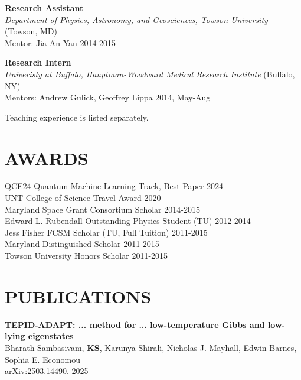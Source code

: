 \documentclass[marginmode, 10pt]{res} %
\newcommand{\me}{\textbf{KS}}       %
\begin{document}
\begin{resume}
\textbf{Research Assistant} \\
\textit{Department of Physics, Astronomy, and Geosciences, Towson University} (Towson, MD) \\
Mentor: Jia-An Yan \hfill 2014-2015

\textbf{Research Intern} \\
\textit{Univeristy at Buffalo, Hauptman-Woodward Medical Research Institute} (Buffalo, NY) \\
Mentors: Andrew Gulick, Geoffrey Lippa \hfill 2014, May-Aug

Teaching experience is listed separately.


\section{\small{AWARDS}}

QCE24 Quantum Machine Learning Track, Best Paper \hfill 2024 \\
UNT College of Science Travel Award \hfill 2020 \\
Maryland Space Grant Consortium Scholar \hfill 2014-2015 \\
Edward L. Rubendall Outstanding Physics Student (TU) \hfill 2012-2014 \\
Jess Fisher FCSM Scholar (TU, Full Tuition) \hfill 2011-2015 \\
Maryland Distinguished Scholar \hfill 2011-2015 \\
Towson University Honors Scholar \hfill 2011-2015


\section{\small{PUBLICATIONS}}

\textbf{TEPID-ADAPT: ... method for ... low-temperature Gibbs and low-lying eigenstates} \\
    Bharath Sambasivam, \me, Karunya Shirali, Nicholas J. Mayhall, Edwin Barnes, Sophia E. Economou \\
    \href{https://arxiv.org/abs/2503.14490}{arXiv:2503.14490.} \hfill 2025


\end{resume}
\end{document}

